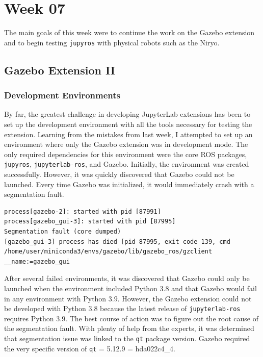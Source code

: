 \chapter{Week 07}

    The main goals of this week were to continue the work on the Gazebo extension and to begin testing \texttt{jupyros} with physical robots such as the Niryo.

\section{Gazebo Extension II}

    \subsection{Development Environments}
    
    By far, the greatest challenge in developing JupyterLab extensions has been to set up the development environment with all the tools necessary for testing the extension. Learning from the mistakes from last week, I attempted to set up an environment where only the Gazebo extension was in development mode. The only required dependencies for this environment were the core ROS packages, \texttt{jupyros}, \texttt{jupyterlab-ros}, and Gazebo. Initially, the environment was created successfully. However, it was quickly discovered that Gazebo could not be launched. Every time Gazebo was initialized, it would immediately crash with a segmentation fault.
    
    \begin{lstlisting}[language=error]
process[gazebo-2]: started with pid [87991]          
process[gazebo_gui-3]: started with pid [87995] 
Segmentation fault (core dumped)
[gazebo_gui-3] process has died [pid 87995, exit code 139, cmd /home/user/miniconda3/envs/gazebo/lib/gazebo_ros/gzclient __name:=gazebo_gui 
    \end{lstlisting}
    
    After several failed environments, it was discovered that Gazebo could only be launched when the environment included Python $3.8$ and that Gazebo would fail in any environment with Python $3.9$. However, the Gazebo extension could not be developed with Python $3.8$ because the latest release of \texttt{jupyterlab-ros} requires Python $3.9$. The best course of action was to figure out the root cause of the segmentation fault. With plenty of help from the experts, it was determined that segmentation issue was linked to the \texttt{qt} package version. Gazebo required the very specific version of \texttt{qt} = 5.12.9 = hda022c4\_4. 
    
